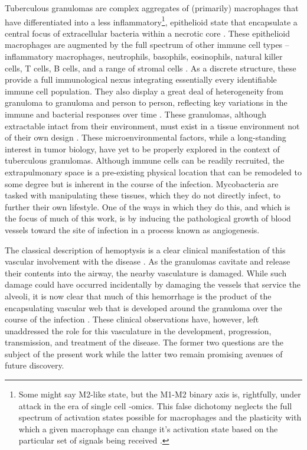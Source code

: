 Tuberculous granulomas are complex aggregates of (primarily) macrophages that have differentiated into a less inflammatory\footnote{Some might say M2\hyp{}like state, but the M1\hyp{}M2 binary axis is, rightfully, under attack in the era of single cell \hyp{}omics. This false dichotomy neglects the full spectrum of activation states possible for macrophages and the plasticity with which a given macrophage can change it's activation state based on the particular set of signals being received \citep{Martinez2014, Ley2017}.}, epithelioid state that encapsulate a central focus of extracellular bacteria within a necrotic core \citep{Boros2003, Rubin2009, Cronan2016}. These epithelioid macrophages are augmented by the full spectrum of other immune cell types -- inflammatory macrophages, neutrophils, basophils, eosinophils, natural killer cells, T cells, B cells, and a range of stromal cells \citep{Russell2007, Ramakrishnan2012}. As a discrete structure, these provide a full immunological nexus integrating essentially every identifiable immune cell population. They also display a great deal of heterogeneity from granuloma to granuloma and person to person, reflecting key variations in the immune and bacterial responses over time \citep{Cadena2017, Gideon2022}. These granulomas, although extractable intact from their environment, must exist in a tissue environment not of their own design \citep{Datta2015, Kaplan2003, McCaffrey2022, Cronan2018}. These microenvironmental factors, while a long\hyp{}standing interest in tumor biology, have yet to be properly explored in the context of tuberculous granulomas. Although immune cells can be readily recruited, the extrapulmonary space is a pre\hyp{}existing physical location that can be remodeled to some degree but is inherent in the course of the infection. Mycobacteria are tasked with manipulating these tissues, which they do not directly infect, to further their own lifestyle. One of the ways in which they do this, and which is the focus of much of this work, is by inducing the pathological growth of blood vessels toward the site of infection in a process known as angiogenesis.

The classical description of hemoptysis is a clear clinical manifestation of this vascular involvement with the disease \citep{Middleton1977, Souders1952, Turner2003a, Turner2003b}. As the granulomas cavitate and release their contents into the airway, the nearby vasculature is damaged. While such damage could have occurred incidentally by damaging the vessels that service the alveoli, it is now clear that much of this hemorrhage is the product of the encapsulating vascular web that is developed around the granuloma over the course of the infection \citep{Oehlers2015, Datta2015, Cudkowicz1952}. These clinical observations have, however, left unaddressed the role for this vasculature in the development, progression, transmission, and treatment of the disease. The former two questions are the subject of the present work while the latter two remain promising avenues of future discovery.

